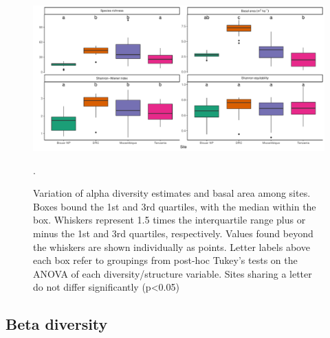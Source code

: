 \begin{refsection}
\begin{figure}[!h]
\centering
	\includegraphics[width=\textwidth]{img/div_box}
	\caption[Alpha diversity of plots within each site]{Variation of alpha diversity estimates and basal area among sites. Boxes bound the 1st and 3rd quartiles, with the median within the box. Whiskers represent 1.5 times the interquartile range plus or minus the 1st and 3rd quartiles, respectively. Values found beyond the whiskers are shown individually as points. Letter labels above each box refer to groupings from post-hoc Tukey's tests on the ANOVA of each diversity/structure variable. Sites sharing a letter do not differ significantly (p<0.05)}.
    \label{bicuar:div_box}
\end{figure}



\subsection{Beta diversity}
\label{bicuar:ssec:beta}


\end{refsection}

